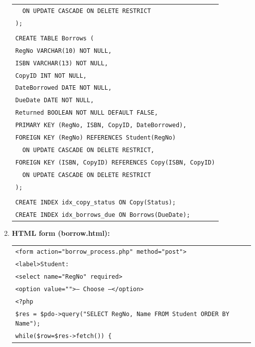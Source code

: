 \documentclass[11pt]{article}
\begin{document}
\begin{exoresolu}
\begin{enumerate}
\begin{center}
\begin{tabular}{|l|}
\texttt{\quad\ \ ON UPDATE CASCADE ON DELETE RESTRICT} \\
\texttt{);} \\
\texttt{} \\
\texttt{CREATE TABLE Borrows (} \\
\texttt{\quad RegNo VARCHAR(10) NOT NULL,} \\
\texttt{\quad ISBN VARCHAR(13) NOT NULL,} \\
\texttt{\quad CopyID INT NOT NULL,} \\
\texttt{\quad DateBorrowed DATE NOT NULL,} \\
\texttt{\quad DueDate DATE NOT NULL,} \\
\texttt{\quad Returned BOOLEAN NOT NULL DEFAULT FALSE,} \\
\texttt{\quad PRIMARY KEY (RegNo, ISBN, CopyID, DateBorrowed),} \\
\texttt{\quad FOREIGN KEY (RegNo) REFERENCES Student(RegNo)} \\
\texttt{\quad\ \ ON UPDATE CASCADE ON DELETE RESTRICT,} \\
\texttt{\quad FOREIGN KEY (ISBN, CopyID) REFERENCES Copy(ISBN, CopyID)} \\
\texttt{\quad\ \ ON UPDATE CASCADE ON DELETE RESTRICT} \\
\texttt{);} \\
\texttt{} \\
\texttt{CREATE INDEX idx\_copy\_status ON Copy(Status);} \\
\texttt{CREATE INDEX idx\_borrows\_due ON Borrows(DueDate);} \\
\hline
\end{tabular}
\end{center}
\item \textbf{HTML form (borrow.html):}
\begin{center}
\begin{tabular}{|l|}
\hline
\texttt{<form action="borrow\_process.php" method="post">} \\
\texttt{\quad <label>Student:} \\
\texttt{\quad\quad <select name="RegNo" required>} \\
\texttt{\quad\quad\quad <option value="">-- Choose --</option>} \\
\texttt{\quad\quad\quad <?php} \\
\texttt{\quad\quad\quad \$res = \$pdo->query("SELECT RegNo, Name FROM Student ORDER BY Name");} \\
\texttt{\quad\quad\quad while(\$row=\$res->fetch()) \{} \\

\end{tabular}
\end{center}
\end{enumerate}
\end{exoresolu}
\end{document}
